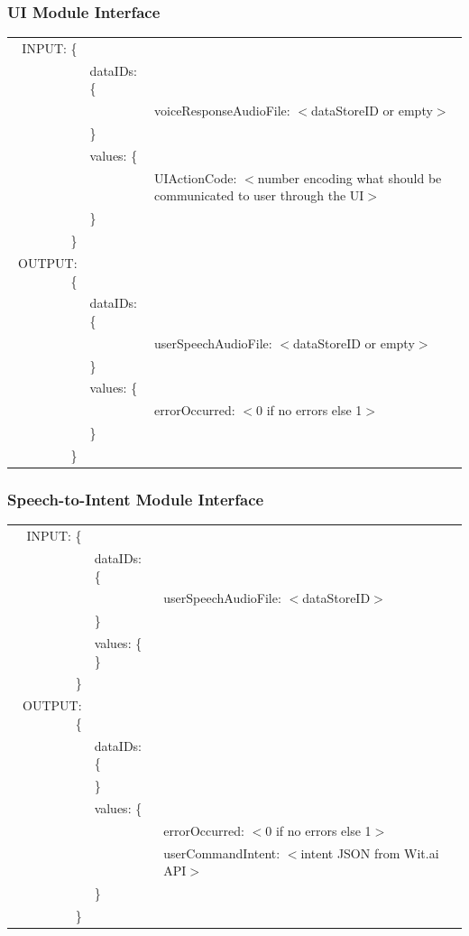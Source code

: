 \documentclass[onecolumn, draftclsnofoot,10pt, compsoc]{IEEEtran}
\begin{document}
        \subsubsection{UI Module Interface}
            \begin{tabular}[t]{r l p{4.5in}}
                INPUT: \{ & & \\
                & dataIDs: \{ & \\
                & & voiceResponseAudioFile: $<$dataStoreID or empty$>$ \\
                & \} & \\
                & values: \{ & \\
                & & UIActionCode: $<$number encoding what should be communicated to user through the UI$>$ \\
                & \} & \\
                \} & & \\
                OUTPUT: \{ & & \\
                & dataIDs: \{ \\
                & & userSpeechAudioFile: $<$dataStoreID or empty$>$ \\  
                & \} & \\
                & values: \{ & \\
                & & errorOccurred: $<$0 if no errors else 1$>$ \\
                & \} & \\
                \} & & \\
            \end{tabular}

        \subsubsection{Speech-to-Intent Module Interface}
            \begin{tabular}[t]{r l p{4.5in}}
                INPUT: \{ & & \\
                & dataIDs: \{ & \\
                & & userSpeechAudioFile: $<$dataStoreID$>$ \\
                & \} & \\
                & values: \{ \} & \\
                \} & & \\
                OUTPUT: \{ & & \\
                & dataIDs: \{ & \\
                & \} & \\
                & values: \{ & \\
                & & errorOccurred: $<$0 if no errors else 1$>$ \\
                & & userCommandIntent: $<$intent JSON from Wit.ai API$>$ \\
                & \} & \\
                \} & & \\
            \end{tabular}
\end{document}
